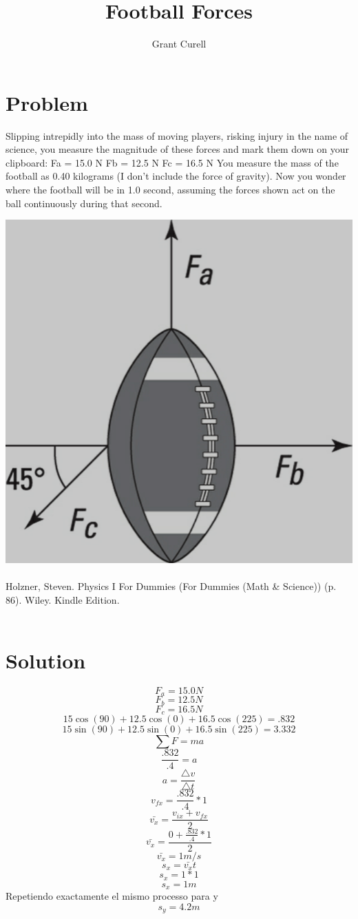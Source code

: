 \documentclass{article}
\title{Football Forces}
\author{Grant Curell}
\begin{document}
\maketitle{}
\section{Problem}
Slipping intrepidly into the mass of moving players, risking injury in the name of science, you measure the magnitude of these forces and mark them down on your clipboard: Fa = 15.0 N Fb = 12.5 N Fc = 16.5 N You measure the mass of the football as 0.40 kilograms (I don’t include the force of gravity). Now you wonder where the football will be in 1.0 second, assuming the forces shown act on the ball continuously during that second.

\includegraphics[width=\columnwidth]{image}
\\\\
Holzner, Steven. Physics I For Dummies (For Dummies (Math \& Science)) (p. 86). Wiley. Kindle Edition.
\\\\
\section{Solution}
\[ F_a = 15.0N \]
\[ F_b = 12.5N \]
\[ F_c = 16.5N \]
\[ 15\cos(90)+12.5\cos(0)+16.5\cos(225)=.832 \]
\[ 15\sin(90)+12.5\sin(0)+16.5\sin(225)=3.332 \]
\[ \sum F=ma \]
\[ \frac{.832}{.4}=a \]
\[ a=\frac{\triangle{v}}{\triangle{t}} \]
\[ v_{fx}=\frac{.832}{.4}*1 \]
\[ \bar{v_x} = \frac{v_{ix}+v_{fx}}{2} \]
\[ \bar{v_x} = \frac{0+\frac{.832}{.4}*1}{2} \]
\[ \bar{v_x} = 1m/s \]
\[ s_x=\bar{v_x}t \]
\[ s_x=1*1 \]
\[ s_x=1m \]
Repetiendo exactamente el mismo processo para y
\[ s_y=4.2m \]
\end{document}
